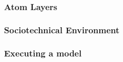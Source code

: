 \subsubsection{Atom Layers}


\subsubsection{Sociotechnical Environment}

\subsubsection{Executing a model}

